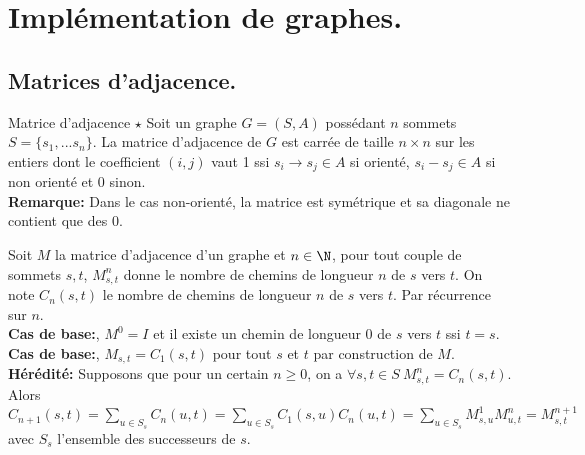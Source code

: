 \documentclass[french, 11pt]{article}
\begin{document}
\vspace*{-1.1cm}

\section{Implémentation de graphes.}

\vspace*{-0.2cm}

\subsection{Matrices d'adjacence.}
\begin{defi}{Matrice d'adjacence $\star$}{}
    Soit un graphe $G=(S,A)$ possédant $n$ sommets $S=\{s_1,...s_n\}$. La matrice d'adjacence de $G$ est carrée de taille $n\times n$ sur les entiers dont le coefficient $(i,j)$ vaut 1 ssi $s_i\to s_j\in A$ si orienté, $s_i-s_j\in A$ si non orienté et 0 sinon.\\
    \textbf{Remarque:} Dans le cas non-orienté, la matrice est symétrique et sa diagonale ne contient que des 0.  
\end{defi}

\vspace*{-0.8cm}

\begin{prop}{}{}
    Soit $M$ la matrice d'adjacence d'un graphe et $n\in\N$, pour tout couple de sommets $s,t$, $M_{s,t}^n$ donne le nombre de chemins de longueur $n$ de $s$ vers $t$.
    \tcblower
    On note $C_n(s,t)$ le nombre de chemins de longueur $n$ de $s$ vers $t$. Par récurrence sur $n$.\\
    \textbf{Cas de base:}, $M^0=I$ et il existe un chemin de longueur 0 de $s$ vers $t$ ssi $t=s$.\\
    \textbf{Cas de base:}, $M_{s,t}=C_1(s,t)$ pour tout $s$ et $t$ par construction de $M$.\\
    \textbf{Hérédité:} Supposons que pour un certain $n\geq0$, on a $\forall s,t\in S ~ M_{s,t}^n=C_n(s,t)$.\\
    Alors $C_{n+1}(s,t)=\sum_{u\in S_s}C_n(u,t)=\sum_{u\in S_s}C_1(s,u)C_n(u,t)=\sum_{u\in S_s}M^1_{s,u}M^n_{u,t}=M^{n+1}_{s,t}$ avec $S_s$ l'ensemble des successeurs de $s$. 
\end{prop}
\end{document}
